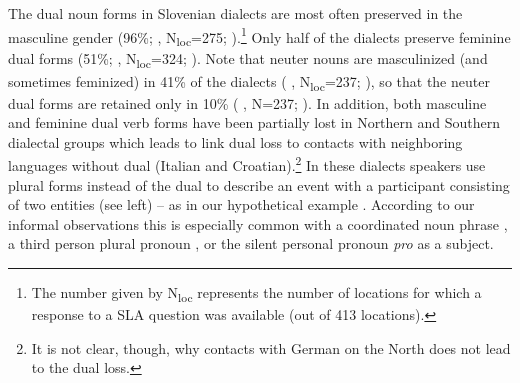 \documentclass[output=paper,colorlinks,citecolor=brown]{langscibook}
\begin{document}
\noindent The dual noun forms in Slovenian dialects are most often preserved in the masculine gender (96\%;  , N\textsubscript{loc}=275; \citealt[135]{Jakop2008}).\footnote{The number given by N\textsubscript{loc} represents the number of locations for which a response to a SLA question was available (out of 413 locations).} Only half of the dialects preserve feminine dual forms (51\%;  , N\textsubscript{loc}=324; \citealt[135--136]{Jakop2008}). Note that neuter nouns are masculinized (and sometimes feminized) in 41\% of the dialects ( , N\textsubscript{loc}=237; \citealt[136]{Jakop2008}), so that the neuter dual forms are retained only in 10\% ( , N=237; \citealt[136]{Jakop2008}). In addition, both masculine and feminine dual verb forms have been partially lost in Northern and Southern dialectal groups which leads \citet{Jakop2008} to link dual loss to contacts with neighboring languages without dual (Italian and Croatian).\footnote{It is not clear, though, why contacts with German on the North does not lead to the dual loss.}  In these dialects speakers use plural forms instead of the dual to describe an event with a participant consisting of two entities (see  left) -- as in our hypothetical example . According to our informal observations this is especially common with a coordinated noun phrase , a third person plural pronoun , or the silent personal pronoun \textit{pro}  as a subject.


\ea \label{pav:ex:5}
 \label{pav:ex:5a}
 \label{pav:ex:5b}
 \label{pav:ex:5c}
 \label{pav:ex:5d}
\z
\z
\end{document}
